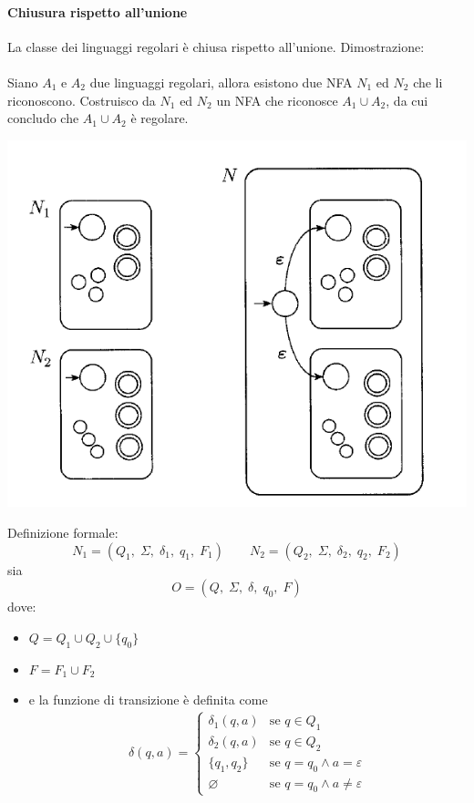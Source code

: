 \documentclass[italian]{article}
\begin{document}
\paragraph{Chiusura rispetto all'unione}
La classe dei linguaggi regolari è chiusa rispetto all'unione. Dimostrazione: \\\\
Siano $A_1$ e $A_2$ due linguaggi regolari, allora esistono due NFA $N_1$ ed $N_2$ che li riconoscono. Costruisco da $N_1$ ed $N_2$ un NFA che riconosce $A_1\cup A_2$, da cui concludo che $A_1\cup A_2$ è regolare.
\begin{center}
	\includegraphics[width=0.7\linewidth]{images/nfa_union}
\end{center}
Definizione formale:
\[
	N_1 = (Q_1,\;\Sigma,\;\delta_1,\;q_1,\;F_1) \qquad N_2 = (Q_2,\;\Sigma,\;\delta_2,\;q_2,\;F_2)
\]
sia 
\[
	O = (Q,\;\Sigma,\;\delta,\;q_0,\;F)
\]
dove:
\begin{itemize}
	\item $Q = Q_1 \cup Q_2 \cup \{q_0\}$
	\item $F = F_1 \cup F_2$
	\item e la funzione di transizione è definita come
		\begin{align*}
		\delta(q,a) = 
		\begin{cases}
			\delta_1(q,a) & \text{se } q \in Q_1 \\
			\delta_2(q,a) & \text{se } q \in Q_2 \\
			\{q_1,q_2\} & \text{se } q=q_0 \land a = \varepsilon \\
			\varnothing & \text{se } q=q_0 \land a \neq \varepsilon 
		\end{cases}
		\end{align*}
\end{itemize}
\pagebreak
\end{document}
